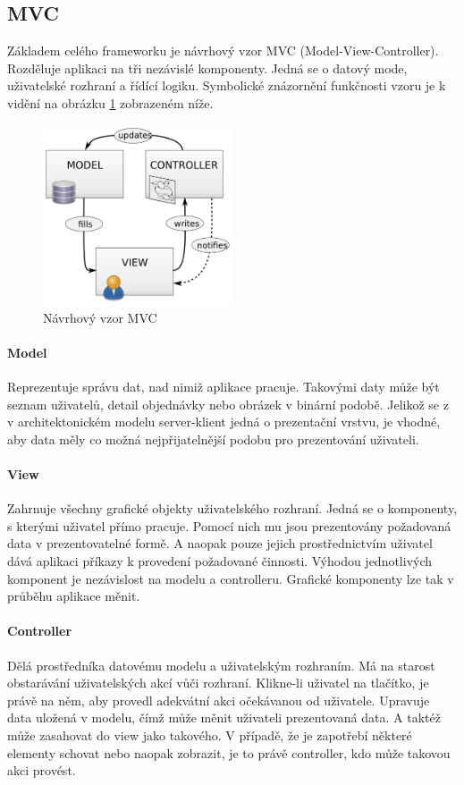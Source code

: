 \documentclass[thesis=M,czech]{FITthesis}[2012/06/26]
\begin{document}
\subsection{MVC}
\label{ssec:mvc}
Základem celého frameworku je návrhový vzor MVC (Model-View-Controller). Rozděluje aplikaci na tři nezávislé komponenty. Jedná se o datový mode, uživatelské rozhraní a řídící logiku. Symbolické znázornění funkčnosti vzoru je k vidění na obrázku \ref{img:mvc} zobrazeném níže.
\begin{figure}[H]
	\centering
	\includegraphics[width=0.5\textwidth]{images/mvc.png}
	\caption{Návrhový vzor MVC}
	\label{img:mvc}
\end{figure}
\paragraph{Model} Reprezentuje správu dat, nad nimiž aplikace pracuje. Takovými daty může být seznam uživatelů, detail objednávky nebo obrázek v binární podobě. Jelikož se z v architektonickém modelu server-klient jedná o prezentační vrstvu, je vhodné, aby data měly co možná nejpřijatelnější podobu pro prezentování uživateli. 
\paragraph{View} Zahrnuje všechny grafické objekty uživatelského rozhraní. Jedná se o komponenty, s kterými uživatel přímo pracuje. Pomocí nich mu jsou prezentovány požadovaná data v prezentovatelné formě. A naopak pouze jejich prostřednictvím uživatel dává aplikaci příkazy k provedení požadované činnosti. Výhodou jednotlivých komponent je nezávislost na modelu a controlleru. Grafické komponenty lze tak v průběhu aplikace měnit. 
\paragraph{Controller} Dělá prostředníka datovému modelu a uživatelským rozhraním. Má na starost obstarávání uživatelských akcí vůči rozhraní. Klikne-li uživatel na tlačítko, je právě na něm, aby provedl adekvátní akci očekávanou od uživatele. Upravuje data uložená v modelu, čímž může měnit uživateli prezentovaná data. A taktéž může zasahovat do view jako takového. V případě, že je zapotřebí některé elementy schovat nebo naopak zobrazit, je to právě controller, kdo může takovou akci provést.
\end{document}
